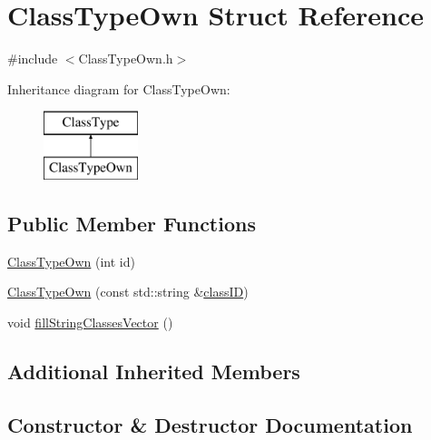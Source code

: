 \hypertarget{struct_class_type_own}{}\section{Class\+Type\+Own Struct Reference}
\label{struct_class_type_own}


{\ttfamily \#include $<$Class\+Type\+Own.\+h$>$}

Inheritance diagram for Class\+Type\+Own\+:\begin{figure}[H]
\begin{center}
\leavevmode
\includegraphics[height=2.000000cm]{struct_class_type_own}
\end{center}
\end{figure}
\subsection*{Public Member Functions}
\begin{DoxyCompactItemize}
\item 
\hyperlink{struct_class_type_own_a1224d96cba263c903f2943477fd25273}{Class\+Type\+Own} (int id)
\item 
\hyperlink{struct_class_type_own_a5a7bbd16b56ab3d470bdfe48a2d1e51b}{Class\+Type\+Own} (const std\+::string \&\hyperlink{struct_class_type_ae50867baa128ab7aabab4f900e03f9cc}{class\+ID})
\item 
void \hyperlink{struct_class_type_own_a4328aa6d88335c50ea33e1bbe6584d7e}{fill\+String\+Classes\+Vector} ()
\end{DoxyCompactItemize}
\subsection*{Additional Inherited Members}


\subsection{Constructor \& Destructor Documentation}
\mbox{\label{struct_class_type_own_a1224d96cba263c903f2943477fd25273}} 
